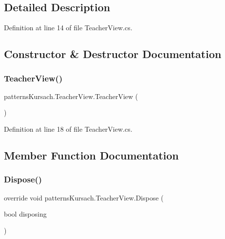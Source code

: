 \subsection{Detailed Description}


Definition at line 14 of file Teacher\+View.\+cs.



\subsection{Constructor \& Destructor Documentation}
\mbox{\label{classpatterns_kursach_1_1_teacher_view_a1096d03ed22a60d848473f3a10f01179}} 
\subsubsection{\texorpdfstring{Teacher\+View()}{TeacherView()}}
{\footnotesize\ttfamily patterns\+Kursach.\+Teacher\+View.\+Teacher\+View (\begin{DoxyParamCaption}{ }\end{DoxyParamCaption})}



Definition at line 18 of file Teacher\+View.\+cs.



\subsection{Member Function Documentation}
\mbox{\label{classpatterns_kursach_1_1_teacher_view_a3c824cb6726bdf46cdb2b3de0578d4d9}} 
\subsubsection{\texorpdfstring{Dispose()}{Dispose()}}
{\footnotesize\ttfamily override void patterns\+Kursach.\+Teacher\+View.\+Dispose (\begin{DoxyParamCaption}\item[{bool}]{disposing }\end{DoxyParamCaption})\hspace{0.3cm}{\ttfamily [protected]}}



